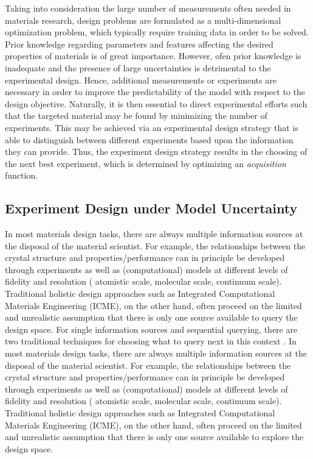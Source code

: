 \documentclass[utf8]{frontiersSCNS} %
\begin{document}
 Taking into consideration the large number of measurements often needed in materials research, design problems are formulated as a multi-dimensional optimization problem, which typically require training data in order to be solved.  Prior knowledge regarding parameters and features affecting the desired properties of materials is of great importance. However, ofen prior knowledge is inadequate and the presence of large uncertainties is detrimental to the experimental design. Hence, additional measurements or experiments are necessary in order to improve the predictability of the model with respect to the design objective. Naturally, it is then essential to direct experimental efforts such that the targeted material may be found by minimizing the number of experiments. This may be achieved via an experimental design strategy that is able to distinguish between different experiments based upon the information they can provide. Thus, the experiment design strategy results in the choosing of the next best experiment, which is determined by optimizing an \textit{acquisition} function.

\subsection{Experiment Design under Model Uncertainty}
In most materials design tasks, there are always multiple information sources at the disposal of the material scientist. 
For example, the relationships between the crystal structure and properties/performance can in principle be developed through experiments as well as (computational) models at different levels of fidelity and resolution ( atomistic scale, molecular scale, continuum scale). Traditional holistic design approaches such as Integrated Computational Materials Engineering (ICME), on the other hand, often proceed on the limited and unrealistic assumption that there is only one source available to query the design space.
For single information sources and sequential querying, there are two traditional techniques for choosing what to query next in this context \cite{lynch2007introduction}. In most materials design tasks, there are always multiple information sources at the disposal of the material scientist. For example, the relationships between the crystal structure and properties/performance can in principle be developed through experiments as well as (computational) models at different levels of fidelity and resolution ( atomistic scale, molecular scale, continuum scale). Traditional holistic design approaches such as Integrated Computational Materials Engineering (ICME), on the other hand, often proceed on the limited and unrealistic assumption that there is only one source available to explore the design space.
\end{document}
